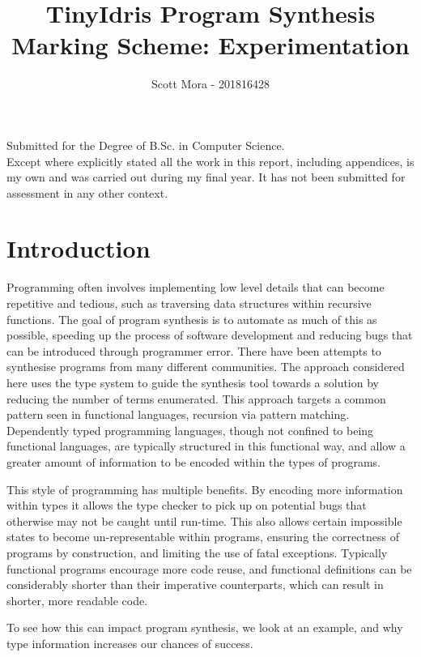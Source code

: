 \documentclass[a4paper]{article}
\author{Scott Mora - 201816428}
\date{}
\title{TinyIdris Program Synthesis\\\medskip
\large Marking Scheme: Experimentation}
\begin{document}
\maketitle
\begin{center}
\vspace{15mm}
Submitted for the Degree of B.Sc. in Computer Science. \\
\vspace{15mm}
Except where explicitly stated all the work in this report, including appendices, is my own and was carried out during my final year. It has not been submitted for assessment in any other context. 
 \end{center}
\clearpage
\tableofcontents
\clearpage

\section{Introduction}
\label{sec:orgf1aad56}

Programming often involves implementing low level details that can
become repetitive and tedious, such as traversing data structures
within recursive functions.
The goal of program synthesis is to automate as much of this as
possible, speeding up the process of software development and reducing
bugs that can be introduced through programmer error. There have been
attempts to synthesise programs from many different communities.
The approach considered here uses the type system to guide the synthesis
tool towards a solution by reducing the number of terms enumerated.
This approach targets a common pattern seen in functional languages,
recursion via pattern matching. Dependently typed programming languages, 
though not confined to being functional languages, are typically 
structured in this functional way, and allow a greater amount of 
information to be encoded within the types of programs. 

This style of programming has multiple benefits. By encoding more 
information within types it allows the type checker to pick up on 
potential bugs that otherwise may not be caught until run-time. This
also allows certain impossible states to become un-representable within
programs, ensuring the correctness of programs by construction, and limiting the use of fatal exceptions. Typically functional programs
encourage more code reuse, and functional definitions can be
considerably shorter than their imperative counterparts, which can
result in shorter, more readable code.

To see how this can impact program synthesis, we look at an example, 
and why type information increases our chances of success. 
\end{document}
